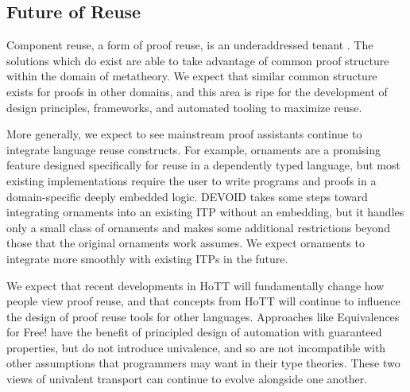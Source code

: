 \subsection{Future of Reuse}

Component reuse, a form of proof reuse, is an
underaddressed tenant \poplmark. The solutions which do
exist are able to take advantage of common proof structure within the
domain of metatheory. We expect that similar common structure exists
for proofs in other domains, and this area is ripe for the development
of design principles, frameworks, and automated tooling to maximize
reuse.

More generally, we expect to see mainstream proof assistants continue
to integrate language reuse constructs. For example, ornaments are a
promising feature designed specifically for reuse in a dependently
typed language, but most existing implementations require the user to write
programs and proofs in a domain-specific deeply embedded logic.
\textsc{DEVOID} takes some steps toward integrating ornaments into an existing ITP
without an embedding, but it handles only a small class of ornaments and makes some additional
restrictions beyond those that the original ornaments work assumes.
We expect ornaments to integrate more smoothly with existing ITPs in the future. %

We expect that recent developments in HoTT will
fundamentally change how people view proof reuse, %
and that concepts from HoTT will continue to influence the design of proof reuse
tools for other languages. Approaches like Equivalences for Free! have the
benefit of principled design of automation with guaranteed properties,
but do not introduce univalence, and so are not incompatible with
other assumptions that programmers may want in their type theories.
These two views of univalent transport
can continue to evolve alongside one another.




